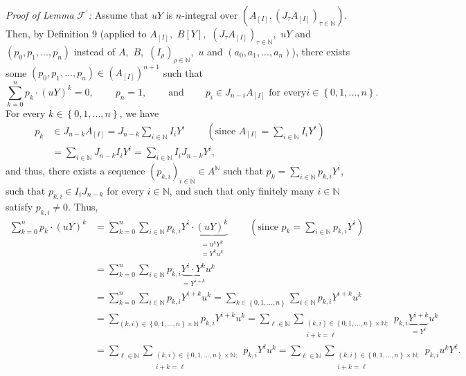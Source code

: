 \documentclass[12pt,final,notitlepage,onecolumn]{article}%
\begin{document}
\textit{Proof of Lemma }$\mathcal{F}^{\prime}$\textit{:} Assume that $uY$ is
$n$-integral over $\left(  A_{\left[  I\right]  },\left(  J_{\tau}A_{\left[
I\right]  }\right)  _{\tau\in\mathbb{N}}\right)  $. Then, by Definition 9
(applied to $A_{\left[  I\right]  },$ $B\left[  Y\right]  ,$ $\left(  J_{\tau
}A_{\left[  I\right]  }\right)  _{\tau\in\mathbb{N}},$ $uY$ and $\left(
p_{0},p_{1},...,p_{n}\right)  $ instead of $A,$ $B,$ $\left(  I_{\rho}\right)
_{\rho\in\mathbb{N}},$ $u$ and $\left(  a_{0},a_{1},...,a_{n}\right)  $),
there exists some $\left(  p_{0},p_{1},...,p_{n}\right)  \in\left(  A_{\left[
I\right]  }\right)  ^{n+1}$ such that%
\[
\sum\limits_{k=0}^{n}p_{k}\cdot\left(  uY\right)  ^{k}%
=0,\ \ \ \ \ \ \ \ \ \ p_{n}=1,\ \ \ \ \ \ \ \ \ \ \text{and}%
\ \ \ \ \ \ \ \ \ \ p_{i}\in J_{n-i}A_{\left[  I\right]  }\text{ for every
}i\in\left\{  0,1,...,n\right\}  .
\]
For every $k\in\left\{  0,1,...,n\right\}  $, we have%
\begin{align*}
p_{k}  &  \in J_{n-k}A_{\left[  I\right]  }=J_{n-k}\sum\limits_{i\in
\mathbb{N}}I_{i}Y^{i}\ \ \ \ \ \ \ \ \ \ \left(  \text{since }A_{\left[
I\right]  }=\sum\limits_{i\in\mathbb{N}}I_{i}Y^{i}\right) \\
&  =\sum\limits_{i\in\mathbb{N}}J_{n-k}I_{i}Y^{i}=\sum\limits_{i\in\mathbb{N}%
}I_{i}J_{n-k}Y^{i},
\end{align*}
and thus, there exists a sequence $\left(  p_{k,i}\right)  _{i\in\mathbb{N}%
}\in A^{\mathbb{N}}$ such that $p_{k}=\sum\limits_{i\in\mathbb{N}}p_{k,i}%
Y^{i}$, such that $p_{k,i}\in I_{i}J_{n-k}$ for every $i\in\mathbb{N}$, and
such that only finitely many $i\in\mathbb{N}$ satisfy $p_{k,i}\neq0$. Thus,%
\begin{align*}
\sum\limits_{k=0}^{n}p_{k}\cdot\left(  uY\right)  ^{k}  &  =\sum
\limits_{k=0}^{n}\sum\limits_{i\in\mathbb{N}}p_{k,i}Y^{i}\cdot
\underbrace{\left(  uY\right)  ^{k}}_{\substack{=u^{k}Y^{k}\\=Y^{k}u^{k}%
}}\ \ \ \ \ \ \ \ \ \ \left(  \text{since }p_{k}=\sum\limits_{i\in\mathbb{N}%
}p_{k,i}Y^{i}\right) \\
&  =\sum\limits_{k=0}^{n}\sum\limits_{i\in\mathbb{N}}p_{k,i}\underbrace{Y^{i}%
\cdot Y^{k}}_{=Y^{i+k}}u^{k}\\
&  =\sum\limits_{k=0}^{n}\sum\limits_{i\in\mathbb{N}}p_{k,i}Y^{i+k}u^{k}%
=\sum\limits_{k\in\left\{  0,1,...,n\right\}  }\sum\limits_{i\in\mathbb{N}%
}p_{k,i}Y^{i+k}u^{k}\\
&  =\sum\limits_{\left(  k,i\right)  \in\left\{  0,1,...,n\right\}
\times\mathbb{N}}p_{k,i}Y^{i+k}u^{k}=\sum_{\ell\in\mathbb{N}}\sum
\limits_{\substack{\left(  k,i\right)  \in\left\{  0,1,...,n\right\}
\times\mathbb{N};\\i+k=\ell}}p_{k,i}\underbrace{Y^{i+k}}_{=Y^{\ell}}u^{k}\\
&  =\sum_{\ell\in\mathbb{N}}\sum\limits_{\substack{\left(  k,i\right)
\in\left\{  0,1,...,n\right\}  \times\mathbb{N};\\i+k=\ell}}p_{k,i}Y^{\ell
}u^{k}=\sum_{\ell\in\mathbb{N}}\sum\limits_{\substack{\left(  k,i\right)
\in\left\{  0,1,...,n\right\}  \times\mathbb{N};\\i+k=\ell}}p_{k,i}%
u^{k}Y^{\ell}.
\end{align*}
\end{document}
